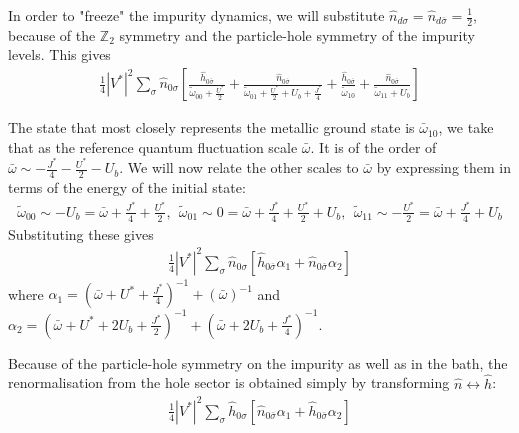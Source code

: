 In order to "freeze" the impurity dynamics, we will substitute \(\hat n_{d\sigma} = \hat n_{d\bar\sigma} = \frac{1}{2}\), because of the \(\mathbb{Z}_2\) symmetry and the particle-hole symmetry of the impurity levels. This gives
\begin{equation}\begin{aligned}
	\frac{1}{4}|V^*|^2 \sum_\sigma \hat n_{0\sigma} \left[\frac{\hat h_{0\bar\sigma}}{\tilde\omega_{00} + \frac{U^*}{2}} + \frac{\hat n_{0\bar\sigma}}{\tilde\omega_{01} + \frac{U^*}{2} + U_b + \frac{J^*}{4}} + \frac{\hat h_{0\bar\sigma}}{\tilde\omega_{10}} + \frac{\hat n_{0\bar\sigma}}{\tilde\omega_{11} + U_b}\right]
\end{aligned}\end{equation}

The state that most closely represents the metallic ground state is \(\bar \omega_{10}\), we take that as the reference quantum fluctuation scale \(\bar\omega\). It is of the order of \(\bar\omega \sim -\frac{J^*}{4} - \frac{U^*}{2} - U_b\). We will now relate the other scales to \(\bar\omega\) by expressing them in terms of the energy of the initial state:
\begin{equation}\begin{aligned}
	\tilde\omega_{00} \sim -U_b = \bar\omega + \frac{J^*}{4} + \frac{U^*}{2}, ~~ \tilde\omega_{01} \sim 0 = \bar\omega + \frac{J^*}{4} + \frac{U^*}{2} + U_b, ~~ \tilde\omega_{11} \sim -\frac{U^*}{2} = \bar\omega + \frac{J^*}{4} + U_b
\end{aligned}\end{equation}
Substituting these gives
\begin{equation}\begin{aligned}
	\frac{1}{4}|V^*|^2 \sum_\sigma \hat n_{0\sigma} \left[\hat h_{0\bar\sigma}\alpha_1 + \hat n_{0\bar\sigma}\alpha_2\right]
\end{aligned}\end{equation}
where \(\alpha_1 = \left(\bar\omega + U^* + \frac{J^*}{4}\right)^{-1} + \left(\bar\omega\right)^{-1}\) and \(\alpha_2 = \left(\bar\omega + U^* + 2U_b + \frac{J^*}{2}\right)^{-1} + \left(\bar\omega + 2U_b + \frac{J^*}{4}\right)^{-1}\).

Because of the particle-hole symmetry on the impurity as well as in the bath, the renormalisation from the hole sector is obtained simply by transforming \(\hat n \leftrightarrow \hat h\):
\begin{equation}\begin{aligned}
	\frac{1}{4}|V^*|^2 \sum_\sigma \hat h_{0\sigma} \left[\hat n_{0\bar\sigma}\alpha_1 + \hat h_{0\bar\sigma}\alpha_2\right]
\end{aligned}\end{equation}

